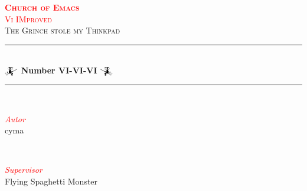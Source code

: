 \documentclass[a4paper,twoside,11pt]{article}
\begin{document}

\begin{titlepage}
 \newcommand{\HRule}{\rule{\linewidth}{0.5mm}}

	\center


    \textsc{\LARGE \bf\textcolor{red}{Church of Emacs}}\\[1.5cm] %

    \textsc{\Large \textcolor{red}{Vi IMproved}}\\[0.5cm] %

	\textsc{\large The Grinch stole my Thinkpad}\\[0.5cm] %


	\HRule\\[0.4cm]

    {\huge\bfseries $\mathwitch$ Number VI-VI-VI $\reversemathwitch$}\\[0.4cm] %

	\HRule\\[1.5cm]


	\begin{minipage}{0.4\textwidth}
		\begin{flushleft}
			\large
            \textit{\textcolor{red}{Autor}}\\
			cyma %
		\end{flushleft}
	\end{minipage}
	~
	\begin{minipage}{0.4\textwidth}
		\begin{flushright}
			\large
            \textit{\textcolor{red}{Supervisor}}\\
			Flying Spaghetti Monster%
		\end{flushright}
	\end{minipage}



\end{titlepage}
\end{document}
